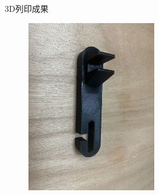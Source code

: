 \noindent 3D列印成果

\begin{figure}[h!]
    \centering
    \includegraphics[width=0.5\textwidth]{./../images/6-1-25.JPG}
\end{figure}


